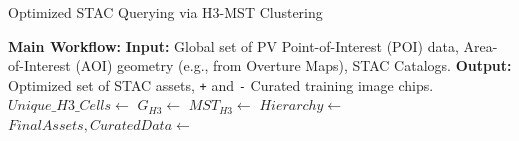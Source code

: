 \begin{algorithm}
\caption{Optimized STAC Querying via H3-MST Clustering}
\label{alg:stac_query_optimization}
\begin{algorithmic}[1]
    \State \textbf{Main Workflow:}
    \State \textbf{Input:} Global set of PV Point-of-Interest (POI) data, Area-of-Interest (AOI) geometry (e.g., from Overture Maps), STAC Catalogs.
    \State \textbf{Output:} Optimized set of STAC assets, \texttt{+} and \texttt{-} Curated training image chips.
    \State $Unique\_H3\_Cells \leftarrow$ 
    \State $G_{H3} \leftarrow$  
    \State $MST_{H3} \leftarrow$  
    \State $Hierarchy \leftarrow$  
    \State $FinalAssets, CuratedData \leftarrow$ \newline {}
\end{algorithmic}
\end{algorithm}



